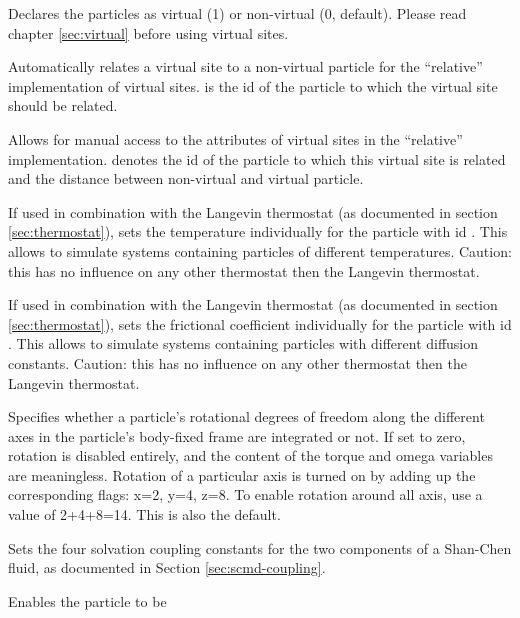 \begin{arguments}
\item[\opt{virtual \var{v}}] Declares the particles as virtual (1) or
  non-virtual (0, default). Please read chapter \ref{sec:virtual}
  before using virtual sites.
\item[\opt{vs\_auto\_relate\_to \var{pid}}] Automatically relates a
  virtual site to a non-virtual particle for the ``relative''
  implementation of virtual sites.  is the id of the particle
  to which the virtual site should be related.
\item[\opt{vs\_relative \var{pid} \var{distance}}] Allows for manual
  access to the attributes of virtual sites in the ``relative''
  implementation.  denotes the id of the particle to which
  this virtual site is related and  the distance between
  non-virtual and virtual particle.
\item[\opt{temp \var{T}}] If used in combination with the Langevin
  thermostat (as documented in section \ref{sec:thermostat}), sets the
  temperature  individually for the particle with id
  . This allows to simulate systems containing particles of
  different temperatures. Caution: this has no influence on any other
  thermostat then the Langevin thermostat.
\item[\opt{gamma \var{g}}] If used in combination with the Langevin
  thermostat (as documented in section \ref{sec:thermostat}), sets the
  frictional coefficient  individually for the particle with id
  . This allows to simulate systems containing particles with
  different diffusion constants. Caution: this has no influence on any
  other thermostat then the Langevin thermostat.
\item[\opt{rotation \var{rot}}] Specifies whether a particle's
  rotational degrees of freedom along the different axes in the particle's body-fixed frame are integrated or not.
  If set to zero, rotation is disabled entirely, and the content of the torque and omega variables
  are meaningless. 
  Rotation of a particular axis is turned on by adding up the corresponding flags: x=2, y=4, z=8.
  To enable rotation around all axis, use a value of 2+4+8=14. This is also the default.
\item[\opt{solvation \var{lA} \var{kA} \var{lB} \var{kB}}] Sets the
  four solvation coupling constants for the two components of a
  Shan-Chen fluid, as documented in Section \ref{sec:scmd-coupling}.
\item[\opt{swimming \alt{\alt{v_swim \var{v\_swim} \asep f_swim
        \var{f\_swim}} \asep off}}] Enables the particle to be

\end{arguments}
